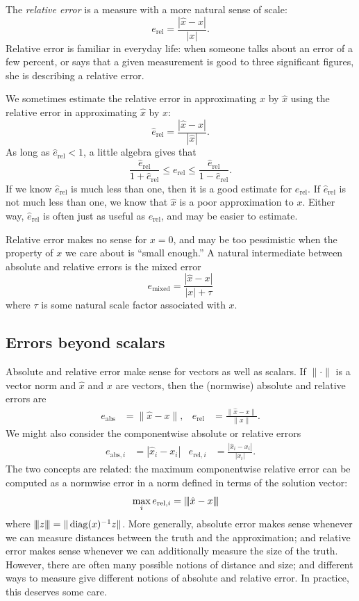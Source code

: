 \documentclass[12pt, leqno]{article}
\begin{document}
The {\em relative error} is a measure with a more natural
sense of scale:
\[
  e_{\mathrm{rel}} = \frac{|\hat{x}-x|}{|x|}.
\]
Relative error is familiar in everyday life: when someone
talks about an error of a few percent, or says that a given
measurement is good to three significant figures, she is describing
a relative error.

We sometimes estimate the relative error in approximating
$x$ by $\hat{x}$ using the relative error in approximating
$\hat{x}$ by $x$:
\[
  \hat{e}_{\mathrm{rel}} = \frac{|\hat{x}-x|}{|\hat{x}|}.
\]
As long as $\hat{e}_{\mathrm{rel}} < 1$, a little algebra gives that
\[
  \frac{\hat{e}_{\mathrm{rel}}}{1+\hat{e}_{\mathrm{rel}}} \leq
  e_{\mathrm{rel}} \leq
  \frac{\hat{e}_{\mathrm{rel}}}{1-\hat{e}_{\mathrm{rel}}}.
\]
If we know $\hat{e}_{\mathrm{rel}}$ is much less than one, then it
is a good estimate for $e_{\mathrm{rel}}$.  If
$\hat{e}_{\mathrm{rel}}$ is not much less than one,
we know that $\hat{x}$ is a poor approximation to $x$.
Either way, $\hat{e}_{\mathrm{rel}}$ is often just as useful
as $e_{\mathrm{rel}}$, and may be easier to estimate.

Relative error makes no sense for $x = 0$, and may be too pessimistic
when the property of $x$ we care about is ``small enough.''  A natural
intermediate between absolute and relative errors is the mixed error
\[
  e_{\mathrm{mixed}} = \frac{|\hat{x}-x|}{|x| + \tau}
\]
where $\tau$ is some natural scale factor associated with $x$.

\subsection{Errors beyond scalars}

Absolute and relative error make sense for vectors as well as scalars.
If $\| \cdot \|$ is a vector
norm and $\hat{x}$ and $x$ are vectors, then the (normwise) absolute
and relative errors are
\begin{align*}
  e_{\mathrm{abs}} &= \|\hat{x}-x\|, &
  e_{\mathrm{rel}} &= \frac{\|\hat{x}-x\|}{\|x\|}.
\end{align*}
We might also consider the componentwise absolute or relative errors
\begin{align*}
  e_{\mathrm{abs},i} &= |\hat{x}_i-x_i| &
  e_{\mathrm{rel},i} &= \frac{|\hat{x}_i-x_i|}{|x_i|}.
\end{align*}
The two concepts are related: the maximum componentwise relative error
can be computed as a normwise error in a norm defined in terms of the
solution vector:
\begin{align*}
  \max_i e_{\mathrm{rel},i} &= {\left\vert\kern-0.25ex\left\vert\kern-0.25ex\left\vert \hat{x}-x \right\vert\kern-0.25ex\right\vert\kern-0.25ex\right\vert}
\end{align*}
where ${\left\vert\kern-0.25ex\left\vert\kern-0.25ex\left\vert z \right\vert\kern-0.25ex\right\vert\kern-0.25ex\right\vert} = \|\operatorname{diag}(x)^{-1} z\|$.
More generally, absolute error makes sense whenever we can measure
distances between the truth and the approximation; and relative error
makes sense whenever we can additionally measure the size of the
truth.  However, there are often many possible notions of distance
and size; and different ways to measure give different notions of
absolute and relative error.  In practice, this deserves some care.
\end{document}
